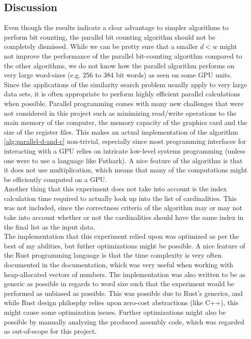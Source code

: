 \subsection{Discussion}
Even though the results indicate a clear advantage to simpler algorithms to perform bit counting, the parallel bit counting algorithm should not be completely dismissed. While we can be pretty sure that a smaller $d < w$ might not improve the performance of the parallel bit-counting algorithm compared to the other algorithms, we do not know how the parallel algorithm performs on very large word-sizes (e.g. 256 to 384 bit words) as seen on some GPU units\cite{techpowerup}. Since the applications of the similarity search problem usually apply to very large data sets, it is often appropriate to perform highly efficient parallel calculations when possible. 
Parallel programming comes with many new challenges that were not considered in this project such as minimizing read/write operations to the main memory of the computer, the memory capacity of the graphics card and the size of the register files. 
This makes an actual implementation of the algorithm \ref{alg:parallel-d-and-c} non-trivial, especially since most programming interfaces for interacting with a GPU relies on intricate low-level systems programming (unless one were to use a language like Futhark\cite{futhark}). A nice feature of the algorithm is that it does not use multiplication, which means that many of the computations might be efficiently computed on a GPU.\\
Another thing that this experiment does not take into account is the index calculation time required to actually look up into the list of cardinalities. This was not included, since the correctness criteria of the algorithm may or may not take into account whether or not the cardinalities should have the same index in the final list as the input data.\\
The implementation that this experiment relied upon was optimized as per the best of my abilities, but futher optimizations might be possible. A nice feature of the Rust programming language is that the time complexity is very often documented in the documentation, which was very useful when working with heap-allocated vectors of numbers. The implementation was also written to be as generic as possible in regards to word size such that the experiment would be performed as unbiased as possible. This was possible due to Rust's generics, and while Rust design philosphy relies upon zero-cost abstractions\cite{rust-lang} (like C++), this might cause some optimization issues. Further optimizations might also be possible by manually analyzing the produced assembly code, which was regarded as out-of-scope for this project.\\
